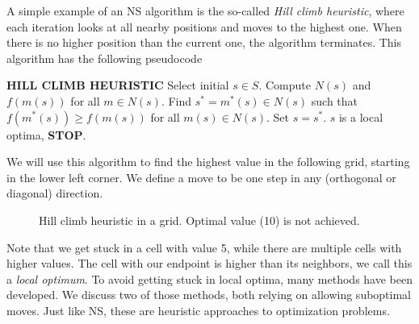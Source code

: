 A simple example of an NS algorithm is the so-called \emph{Hill climb heuristic}, where each iteration looks at all nearby positions and moves to the highest one. When there is no higher position than the current one, the algorithm terminates. This algorithm has the following pseudocode

\hfill
\begin{algorithmic}[1]
    \BeginBox
    \Statex \textbf{HILL CLIMB HEURISTIC}
    \State Select initial $s\in S$.
    \Loop
    \State Compute $N(s)$ and $f(m(s))$ for all $m\in N(s)$.
    \State Find $s^* = m^*(s) \in N(s)$ such that $f(m^*(s)) \geq f(m(s))$ for all $m(s) \in N(s)$.
    \State Set $s = s^*$.
    \Else
    \State $s$ is a local optima, \textbf{STOP}.
    \EndIf
    \EndLoop
    \EndBox
\end{algorithmic}

\hfill

We will use this algorithm to find the highest value in the following grid, starting in the lower left corner. We define a move to be one step in any (orthogonal or diagonal) direction.

\def\matrixdata{
    { 10, 3, 5, 8, 9},
    { 1, 3, 3, 6, 3},
    { 3, 5, 4, 3, 3},
    { 1, 3, 1, 7, 1},
    { 1, 2, 1, 2, 6},
}

\begin{figure}[h]
    \centering
    \caption{Hill climb heuristic in a grid. Optimal value (10) is not achieved.}
    \label{fig:hillclimb}
\end{figure}

Note that we get stuck in a cell with value 5, while there are multiple cells with higher values. The cell with our endpoint is higher than its neighbors, we call this a \emph{local optimum}. To avoid getting stuck in local optima, many methods have been developed. We discuss two of those methods, both relying on allowing suboptimal moves. Just like NS, these are heuristic approaches to optimization problems.

